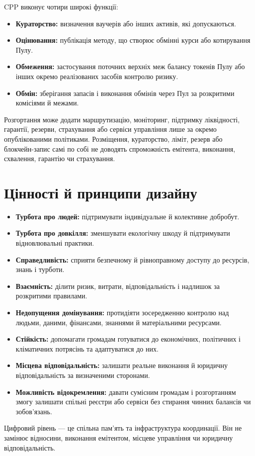 \documentclass[11pt]{article}
\begin{document}
CPP виконує чотири широкі функції:

\begin{itemize}[leftmargin=*]
\item \textbf{Кураторство:} визначення ваучерів або інших активів, які допускаються.
\item \textbf{Оцінювання:} публікація методу, що створює обмінні курси або котирування Пулу.
\item \textbf{Обмеження:} застосування поточних верхніх меж балансу токенів Пулу або інших окремо реалізованих засобів контролю ризику.
\item \textbf{Обмін:} зберігання запасів і виконання обмінів через Пул за розкритими комісіями й межами.
\end{itemize}
Розгортання може додати маршрутизацію, моніторинг, підтримку ліквідності, гарантії, резерви, страхування або сервіси управління лише за окремо опублікованими політиками. Розміщення, кураторство, ліміт, резерв або блокчейн-запис самі по собі не доводять спроможність емітента, виконання, схвалення, гарантію чи страхування.

\section*{Цінності й принципи дизайну}

\begin{itemize}[leftmargin=*]
\item \textbf{Турбота про людей:} підтримувати індивідуальне й колективне добробут.
\item \textbf{Турбота про довкілля:} зменшувати екологічну шкоду й підтримувати відновлювальні практики.
\item \textbf{Справедливість:} сприяти безпечному й рівноправному доступу до ресурсів, знань і турботи.
\item \textbf{Взаємність:} ділити ризик, витрати, відповідальність і надлишок за розкритими правилами.
\item \textbf{Недопущення домінування:} протидіяти зосередженню контролю над людьми, даними, фінансами, знаннями й матеріальними ресурсами.
\item \textbf{Стійкість:} допомагати громадам готуватися до економічних, політичних і кліматичних потрясінь та адаптуватися до них.
\item \textbf{Місцева відповідальність:} залишати реальне виконання й юридичну відповідальність за визначеними сторонами.
\item \textbf{Можливість відокремлення:} давати сумісним громадам і розгортанням змогу залишати спільні реєстри або сервіси без стирання чинних балансів чи зобов'язань.
\end{itemize}
Цифровий рівень --- це спільна пам'ять та інфраструктура координації. Він не замінює відносини, виконання емітентом, місцеве управління чи юридичну відповідальність.
\end{document}
